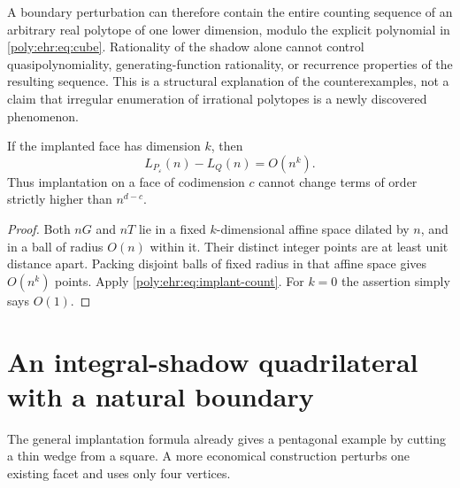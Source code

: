 \documentclass[11pt,a4paper]{article}
\numberwithin{equation}{section}
\theoremstyle{plain}
\newcommand{\eps}{\varepsilon}
\begin{document}
A boundary perturbation can therefore contain the entire counting sequence
of an arbitrary real polytope of one lower dimension, modulo the explicit
polynomial in \eqref{poly:ehr:eq:cube}. Rationality of the shadow alone cannot
control quasipolynomiality, generating-function rationality, or recurrence
properties of the resulting sequence. This is a structural explanation of
the counterexamples, not a claim that irregular enumeration of irrational
polytopes is a newly discovered phenomenon.

\begin{proposition}\label{poly:ehr:prop:localization}
If the implanted face has dimension $k$, then
\[
 L_{P_\eps}(n)-L_Q(n)=O(n^k).
\]
Thus implantation on a face of codimension $c$ cannot change terms of order
strictly higher than $n^{d-c}$.
\end{proposition}
\begin{proof}
Both $nG$ and $nT$ lie in a fixed $k$-dimensional affine space dilated by
$n$, and in a ball of radius $O(n)$ within it. Their distinct integer
points are at least unit distance apart. Packing disjoint balls of fixed
radius in that affine space gives $O(n^k)$ points. Apply
\eqref{poly:ehr:eq:implant-count}. For $k=0$ the assertion simply says $O(1)$.
\end{proof}

\section{An integral-shadow quadrilateral with a natural boundary}
\label{poly:ehr:sec:quad}

The general implantation formula already gives a pentagonal example by
cutting a thin wedge from a square. A more economical construction perturbs
one existing facet and uses only four vertices.
\end{document}
